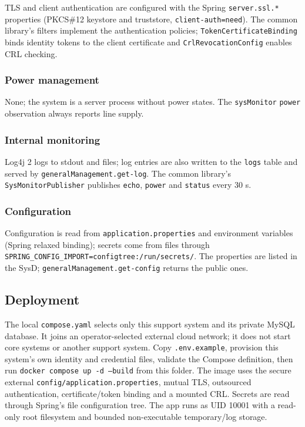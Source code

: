 \documentclass[a4paper]{arrowhead}
\begin{document}
TLS and client authentication are configured with the Spring \texttt{server.\allowbreak{}ssl.\allowbreak{}*} properties (PKCS\#12 keystore and truststore, \texttt{client-\allowbreak{}auth=\allowbreak{}need}). The common library's filters implement the authentication policies; \texttt{Token\allowbreak{}Certificate\allowbreak{}Binding} binds identity tokens to the client certificate and \texttt{Crl\allowbreak{}Revocation\allowbreak{}Config} enables CRL checking.

\subsubsection{Power management}

None; the system is a server process without power states. The \texttt{sysMonitor} \texttt{power} observation always reports line supply.

\subsubsection{Internal monitoring}

Log4j 2 logs to stdout and files; log entries are also written to the \texttt{logs} table and served by \texttt{general\allowbreak{}Management.\allowbreak{}get-\allowbreak{}log}. The common library's \texttt{Sys\allowbreak{}Monitor\allowbreak{}Publisher} publishes \texttt{echo}, \texttt{power} and \texttt{status} every 30 s.

\subsubsection{Configuration}

Configuration is read from \texttt{application.\allowbreak{}properties} and environment variables (Spring relaxed binding); secrets come from files through \texttt{SPRING\_\allowbreak{}CONFIG\_\allowbreak{}IMPORT=\allowbreak{}configtree:\allowbreak{}/\allowbreak{}run/\allowbreak{}secrets/\allowbreak{}}. The properties are listed in the SysD; \texttt{general\allowbreak{}Management.\allowbreak{}get-\allowbreak{}config} returns the public ones.

\subsection{Deployment}

The local \texttt{compose.yaml} selects only this support system and its private MySQL database. It joins an operator-selected external cloud network; it does not start core systems or another support system. Copy \texttt{.env.example}, provision this system's own identity and credential files, validate the Compose definition, then run \texttt{docker compose up -d --build} from this folder. The image uses the secure external \texttt{config/application.properties}, mutual TLS, outsourced authentication, certificate/token binding and a mounted CRL. Secrets are read through Spring's file configuration tree. The app runs as UID 10001 with a read-only root filesystem and bounded non-executable temporary/log storage.
\end{document}
